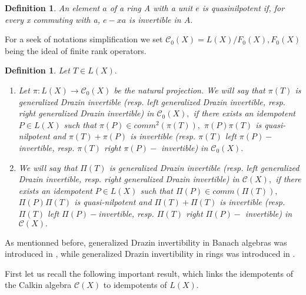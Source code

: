 \documentclass[10pt]{article}
\newcommand{\bdf}{\begin{definition}}
\newcommand{\edf}{\end{definition}}
\newtheorem{definition}[theorem]{Definition}
\numberwithin{equation}{section}
\begin{document}

\bdf  \cite[Definition 2]{HA}  An element $a$  of a   ring A with
a unit $e$ is quasinilpotent if, for every x commuting with a, $e -xa $ is invertible in $A.$ \edf


 For a seek of notations simplification we set 
 $ \mathcal{C}_0(X)= L(X)/F_0(X),  F_0(X)$ being the ideal of finite rank operators. 
   

\bdf \label{gdrazin}  \cite[Definition 3.3]{HB2} Let  $T \in L(X).$
\begin{enumerate}

\item  Let $\pi: L(X) \rightarrow \mathcal{C}_0(X)$ be the natural projection. We will say that $\pi(T)$ is generalized Drazin invertible (resp. left generalized Drazin invertible, resp. right  generalized Drazin invertible) in $\mathcal{C}_0(X),$ if there exists an idempotent $P \in L(X) $   such that  $\pi(P)\in comm^2(\pi(T)),$   $ \pi(P)\pi(T)$ is quasi-nilpotent  and $\pi(T)+ \pi(P)$ is  invertible (resp. $\pi(T)$  left $\pi(P)-$invertible, resp. $\pi(T)$ right $\pi(P)-$ invertible) in $\mathcal{C}_0(X).$ 


\item We will say that $\Pi(T)$ is generalized Drazin invertible (resp. left generalized Drazin invertible, resp. right  generalized Drazin invertible) in $\mathcal{C}(X),$ if there exists an idempotent $P \in L(X) $   such that  $\Pi(P)\in comm(\Pi(T)),$   $ \Pi(P)\Pi(T)$ is quasi-nilpotent  and $\Pi(T)+ \Pi(T) $ is  invertible (resp. $\Pi(T)$  left $\Pi(P)-$invertible, resp. $\Pi(T)$ right $\Pi(P)-$ invertible) in $\mathcal{C}(X).$ 

\end{enumerate}

\edf

As mentionned before,  generalized Drazin invertibility in Banach algebras was introduced in \cite{Koliha}, while  generalized Drazin invertibility in rings  was introduced in \cite{KP}.


 First let us recall the following important result, which links the idempotents of the Calkin algebra   $ \mathcal{C}(X)$  to idempotents of $L(X).$ 
 
\end{document}
